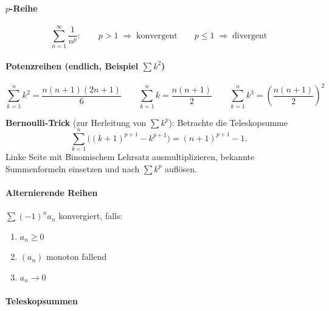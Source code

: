 \documentclass[../../zusammenfassung_AN.tex]{subfiles}
\begin{document}
	\paragraph{$p$-Reihe}
	
	\begin{tcolorbox}[formelbox]
		\[
		\sum_{n=1}^{\infty} \frac{1}{n^p}:\qquad
		p>1 \;\Rightarrow\; \text{konvergent} \qquad
		p\le 1 \;\Rightarrow\; \text{divergent}
		\]
	\end{tcolorbox}
	
	\paragraph{Potenzreihen (endlich, Beispiel $\sum k^2$)}
	
	\begin{tcolorbox}[formelbox]
		\[
		\sum_{k=1}^{n} k^2 = \frac{n(n+1)(2n+1)}{6} \qquad
		\sum_{k=1}^{n} k   = \frac{n(n+1)}{2} \qquad
		\sum_{k=1}^{n} k^3 = \left(\frac{n(n+1)}{2}\right)^2
		\]
	\end{tcolorbox}
	
	\begin{tcolorbox}[hinweis]
		\textbf{Bernoulli-Trick} (zur Herleitung von $\sum k^p$): Betrachte die Teleskopsumme
		\[
		\sum_{k=1}^{n}\bigl((k+1)^{p+1}-k^{p+1}\bigr) = (n+1)^{p+1}-1.
		\]
		Linke Seite mit Binomischem Lehrsatz ausmultiplizieren, bekannte Summenformeln einsetzen und nach $\sum k^p$ auflösen.
	\end{tcolorbox}
	
	\paragraph{Alternierende Reihen}
	
	\begin{tcolorbox}[dglbox, title={Leibniz-Kriterium}]
		$\sum(-1)^n a_n$ konvergiert, falls:
		\begin{enumerate}[noitemsep, topsep=2pt]
			\item $a_n \ge 0$
			\item $(a_n)$ monoton fallend
			\item $a_n \to 0$
		\end{enumerate}
	\end{tcolorbox}
	
	\paragraph{Teleskopsummen}
	
\end{document}
